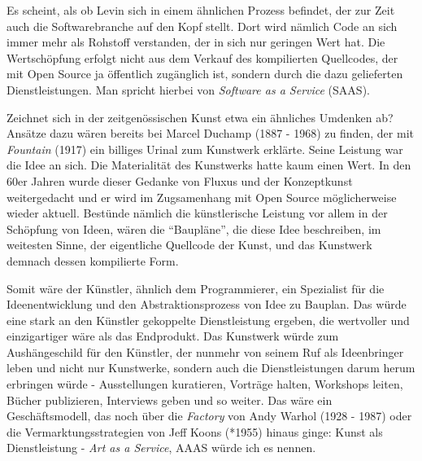 \documentclass[
paper=164mm:234mm, %
pagesize, %
DIV=calc, %
10pt, %
parskip=half- %
]{scrbook}
\begin{document}
Es scheint, als ob Levin sich in einem ähnlichen Prozess befindet, der zur Zeit auch die Softwarebranche auf den Kopf stellt. Dort wird nämlich Code an sich immer mehr als Rohstoff verstanden, der in sich nur geringen Wert hat. Die Wertschöpfung erfolgt nicht aus dem Verkauf des kompilierten Quellcodes, der mit Open Source ja öffentlich zugänglich ist, sondern durch die dazu gelieferten Dienstleistungen. Man spricht hierbei von \emph{Software as a Service} (SAAS).

Zeichnet sich in der zeitgenössischen Kunst etwa ein ähnliches Umdenken ab? Ansätze dazu wären bereits bei Marcel Duchamp (1887 - 1968) zu finden, der mit \emph{Fountain} (1917) ein billiges Urinal zum Kunstwerk erklärte. Seine Leistung war die Idee an sich. Die Materialität des Kunstwerks hatte kaum einen Wert. In den 60er Jahren wurde dieser Gedanke von Fluxus und der Konzeptkunst weitergedacht und er wird im Zugsamenhang mit Open Source möglicherweise wieder aktuell. Bestünde nämlich die künstlerische Leistung vor allem in der Schöpfung von Ideen, wären die \enquote{Baupläne}, die diese Idee beschreiben, im weitesten Sinne, der eigentliche Quellcode der Kunst, und das Kunstwerk demnach dessen kompilierte Form.

Somit wäre der Künstler, ähnlich dem Programmierer, ein Spezialist für die Ideenentwicklung und den Abstraktionsprozess von Idee zu Bauplan. Das würde eine stark an den Künstler gekoppelte Dienstleistung ergeben, die wertvoller und einzigartiger wäre als das Endprodukt. Das Kunstwerk würde zum Aushängeschild für den Künstler, der nunmehr von seinem Ruf als Ideenbringer leben und nicht nur Kunstwerke, sondern auch die Dienstleistungen darum herum erbringen würde - Ausstellungen kuratieren, Vorträge halten, Workshops leiten, Bücher publizieren, Interviews geben und so weiter. Das wäre ein Geschäftsmodell, das noch über die \emph{Factory} von Andy Warhol (1928 - 1987) oder die Vermarktungsstrategien von Jeff Koons (*1955) hinaus ginge: Kunst als Dienstleistung - \emph{Art as a Service}, AAAS würde ich es nennen.
\end{document}
